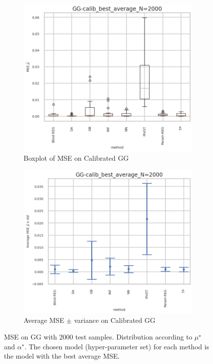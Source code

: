 \begin{figure}[ht!]
  \begin{subfigure}[t]{0.49\linewidth}
    \includegraphics[width=\linewidth]{COMPARE/GG-calib/BEST_MSE/GG-calib_best_average_N=2000-boxplot_mse.png}
    \caption{Boxplot of MSE on Calibrated GG}
  \end{subfigure}%
  \hfill
  \begin{subfigure}[t]{0.49\linewidth}
    \includegraphics[width=\linewidth]{COMPARE/GG-calib/BEST_MSE/GG-calib_best_average_N=2000-errplot_mse.png}
    \caption{Average MSE $\pm$ variance on Calibrated GG}
  \end{subfigure}

  \caption{MSE on GG with 2000 test samples. Distribution according to $\mu^\star$ and $\alpha^\star$. The chosen model (hyper-parameter set) for each method is the model with the best average MSE.}
  \label{fig:compare_gg_best_mse}
\end{figure}
